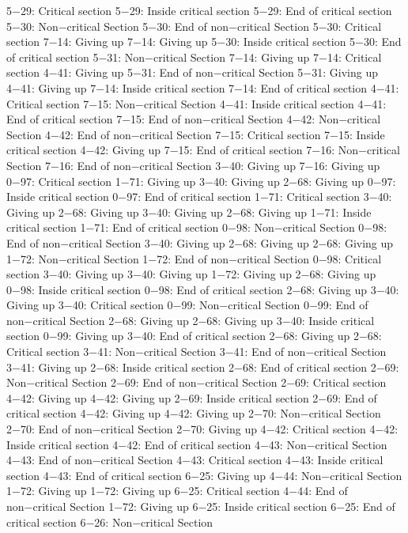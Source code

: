 5−29: Critical section
5−29: Inside critical section
5−29: End of critical section
5−30: Non−critical Section
5−30: End of non−critical Section
5−30: Critical section
7−14: Giving up
7−14: Giving up
5−30: Inside critical section
5−30: End of critical section
5−31: Non−critical Section
7−14: Giving up
7−14: Critical section
4−41: Giving up
5−31: End of non−critical Section
5−31: Giving up
4−41: Giving up
7−14: Inside critical section
7−14: End of critical section
4−41: Critical section
7−15: Non−critical Section
4−41: Inside critical section
4−41: End of critical section
7−15: End of non−critical Section
4−42: Non−critical Section
4−42: End of non−critical Section
7−15: Critical section
7−15: Inside critical section
4−42: Giving up
7−15: End of critical section
7−16: Non−critical Section
7−16: End of non−critical Section
3−40: Giving up
7−16: Giving up
0−97: Critical section
1−71: Giving up
3−40: Giving up
2−68: Giving up
0−97: Inside critical section
0−97: End of critical section
1−71: Critical section
3−40: Giving up
2−68: Giving up
3−40: Giving up
2−68: Giving up
1−71: Inside critical section
1−71: End of critical section
0−98: Non−critical Section
0−98: End of non−critical Section
3−40: Giving up
2−68: Giving up
2−68: Giving up
1−72: Non−critical Section
1−72: End of non−critical Section
0−98: Critical section
3−40: Giving up
3−40: Giving up
1−72: Giving up
2−68: Giving up
0−98: Inside critical section
0−98: End of critical section
2−68: Giving up
3−40: Giving up
3−40: Critical section
0−99: Non−critical Section
0−99: End of non−critical Section
2−68: Giving up
2−68: Giving up
3−40: Inside critical section
0−99: Giving up
3−40: End of critical section
2−68: Giving up
2−68: Critical section
3−41: Non−critical Section
3−41: End of non−critical Section
3−41: Giving up
2−68: Inside critical section
2−68: End of critical section
2−69: Non−critical Section
2−69: End of non−critical Section
2−69: Critical section
4−42: Giving up
4−42: Giving up
2−69: Inside critical section
2−69: End of critical section
4−42: Giving up
4−42: Giving up
2−70: Non−critical Section
2−70: End of non−critical Section
2−70: Giving up
4−42: Critical section
4−42: Inside critical section
4−42: End of critical section
4−43: Non−critical Section
4−43: End of non−critical Section
4−43: Critical section
4−43: Inside critical section
4−43: End of critical section
6−25: Giving up
4−44: Non−critical Section
1−72: Giving up
1−72: Giving up
6−25: Critical section
4−44: End of non−critical Section
1−72: Giving up
6−25: Inside critical section
6−25: End of critical section
6−26: Non−critical Section
